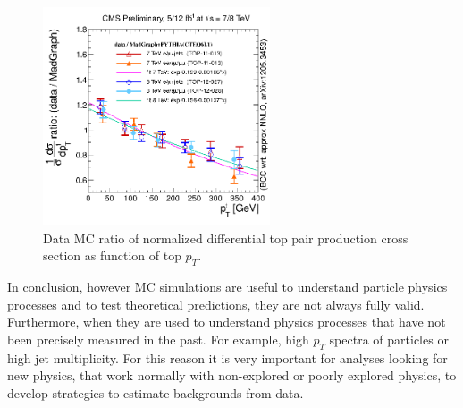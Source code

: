 \begin{figure}[!Hhtbp]
  \begin{center}
    \includegraphics[width=0.6\textwidth]{figs/topPtDataOverMadgraphPythia.png}
    \caption{Data MC ratio of normalized differential top pair production cross section as function of top $p_{T}$.}
    \label{fig:TopPTReweighting}
  \end{center}
\end{figure}

In conclusion, however MC simulations are useful to understand particle physics processes and to test theoretical predictions, they are not always fully valid. Furthermore, when they are used to understand physics processes that have not been precisely measured in the past. For example, high $p_{T}$ spectra of particles or high jet multiplicity. For this reason it is very important for analyses looking for new physics, that work normally with non-explored or poorly explored physics, to develop strategies to estimate backgrounds from data.